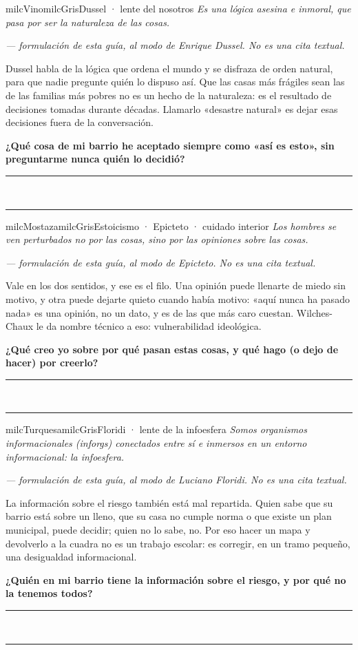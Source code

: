 \documentclass[11pt,letterpaper]{article}
\newcommand{\linead}[1]{\noindent\color{milcLinea}\rule{#1}{0.5pt}\color{milcNegro}}
\begin{document}
\begin{softbox}{milcVino}{milcGris}{Dussel · lente del nosotros}
\textit{Es una lógica asesina e inmoral, que pasa por ser la naturaleza de las cosas.}

{\footnotesize\itshape\color{milcNegro!70}--- formulación de esta guía, al modo de Enrique Dussel. No es una cita textual.}

Dussel habla de la lógica que ordena el mundo y se disfraza de orden natural, para que nadie pregunte quién lo dispuso así. Que las casas más frágiles sean las de las familias más pobres no es un hecho de la naturaleza: es el resultado de decisiones tomadas durante décadas. Llamarlo «desastre natural» es dejar esas decisiones fuera de la conversación.

\textbf{¿Qué cosa de mi barrio he aceptado siempre como «así es esto», sin preguntarme nunca quién lo decidió?}
\end{softbox}
\linead{\linewidth}\\[1mm]
\linead{\linewidth}

\begin{softbox}{milcMostaza}{milcGris}{Estoicismo · Epicteto · cuidado interior}
\textit{Los hombres se ven perturbados no por las cosas, sino por las opiniones sobre las cosas.}

{\footnotesize\itshape\color{milcNegro!70}--- formulación de esta guía, al modo de Epicteto. No es una cita textual.}

Vale en los dos sentidos, y ese es el filo. Una opinión puede llenarte de miedo sin motivo, y otra puede dejarte quieto cuando había motivo: «aquí nunca ha pasado nada» es una opinión, no un dato, y es de las que más caro cuestan. Wilches-Chaux le da nombre técnico a eso: vulnerabilidad ideológica.

\textbf{¿Qué creo yo sobre por qué pasan estas cosas, y qué hago (o dejo de hacer) por creerlo?}
\end{softbox}
\linead{\linewidth}\\[1mm]
\linead{\linewidth}

\begin{softbox}{milcTurquesa}{milcGris}{Floridi · lente de la infoesfera}
\textit{Somos organismos informacionales (inforgs) conectados entre sí e inmersos en un entorno informacional: la infoesfera.}

{\footnotesize\itshape\color{milcNegro!70}--- formulación de esta guía, al modo de Luciano Floridi. No es una cita textual.}

La información sobre el riesgo también está mal repartida. Quien sabe que su barrio está sobre un lleno, que su casa no cumple norma o que existe un plan municipal, puede decidir; quien no lo sabe, no. Por eso hacer un mapa y devolverlo a la cuadra no es un trabajo escolar: es corregir, en un tramo pequeño, una desigualdad informacional.

\textbf{¿Quién en mi barrio tiene la información sobre el riesgo, y por qué no la tenemos todos?}
\end{softbox}
\linead{\linewidth}\\[1mm]
\linead{\linewidth}
\end{document}
